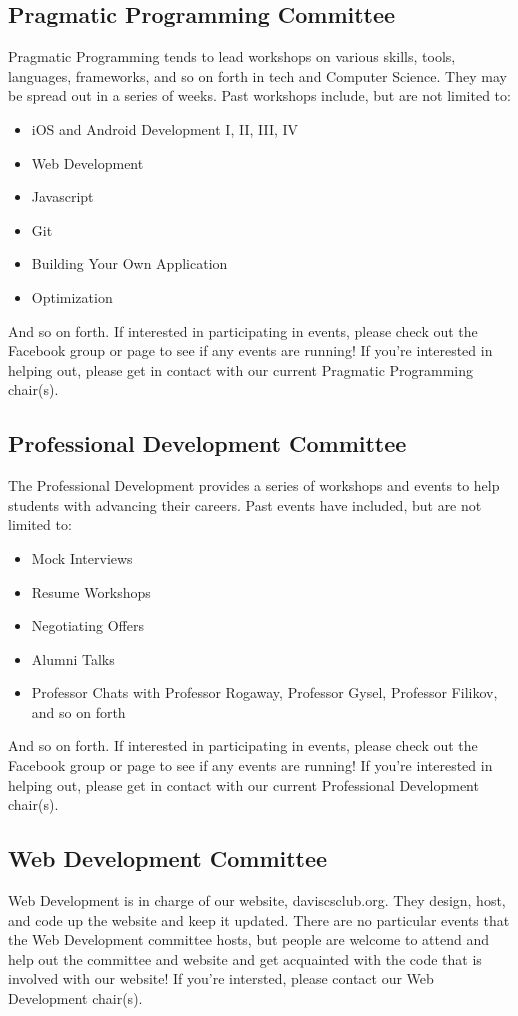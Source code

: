 \documentclass{article}
\begin{document}
\subsection{Pragmatic Programming Committee}
\hspace{0.5cm} Pragmatic Programming tends to lead workshops on various skills, tools, languages, frameworks, and so on forth in tech and Computer Science. They may be spread out in a series of weeks. Past workshops include, but are not limited to: 
\begin{itemize}
    \item iOS and Android Development I, II, III, IV
    \item Web Development
    \item Javascript
    \item Git
    \item Building Your Own Application 
    \item Optimization 
\end{itemize}

And so on forth. If interested in participating in events, please check out the Facebook group or page to see if any events are running! If you're interested in helping out, please get in contact with our current Pragmatic Programming chair(s).
\subsection{Professional Development Committee}
\hspace{0.5cm}The Professional Development provides a series of workshops and events to help students with advancing their careers. Past events have included, but are not limited to: 
\begin{itemize}
    \item Mock Interviews
    \item Resume Workshops
    \item Negotiating Offers
    \item Alumni Talks 
    \item Professor Chats with Professor Rogaway, Professor Gysel, Professor Filikov, and so on forth
\end{itemize}

And so on forth. If interested in participating in events, please check out the Facebook group or page to see if any events are running! If you're interested in helping out, please get in contact with our current Professional Development chair(s).
\subsection{Web Development Committee}
\hspace{0.5cm} Web Development is in charge of our website, daviscsclub.org. They design, host, and code up the website and keep it updated. There are no particular events that the Web Development committee hosts, but people are welcome to attend and help out the committee and website and get acquainted with the code that is involved with our website! If you're intersted, please contact our Web Development chair(s).
\end{document}
